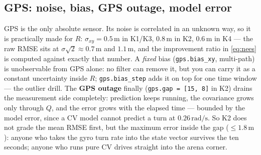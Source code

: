 \documentclass[12pt,a4paper]{scrartcl}
\begin{document}
\subsection{GPS: noise, bias, GPS outage, model error}
GPS is the only absolute sensor. Its noise is correlated in an unknown way, so it is
practically made for \(R\): \(\sigma_{xy}=0.5\,\mathrm{m}\) in K1/K3,
\(0.8\,\mathrm{m}\) in K2, \(0.6\,\mathrm{m}\) in K4 — the raw RMSE sits at
\(\sigma\sqrt2\approx0.7\,\mathrm{m}\) and \(1.1\,\mathrm{m}\), and the
improvement ratio in \cref{eq:nees} is computed against exactly that number. A
\emph{fixed} bias (\texttt{gps.bias\_xy}, multi-path) is unobservable from GPS alone:
no filter can remove it, but you can carry it as a constant uncertainty inside
\(R\); \texttt{gps.bias\_step} adds it on top for one time window — the outlier drill.
The \textbf{GPS outage} finally (\texttt{gps.gap = [15, 8]} in K2) drains the
measurement side completely: prediction keeps running, the covariance grows only
through \(Q\), and the error grows with the elapsed time — bounded by the model error,
since a CV model cannot predict a turn at \(0.26\,\mathrm{rad/s}\). So K2 does not grade
the mean RMSE first, but the maximum error inside the gap (\(\le 1.8\,\mathrm{m}\)):
anyone who takes the gyro turn rate into the state vector survives the ten seconds;
anyone who runs pure CV drives straight into the arena corner.
\end{document}

